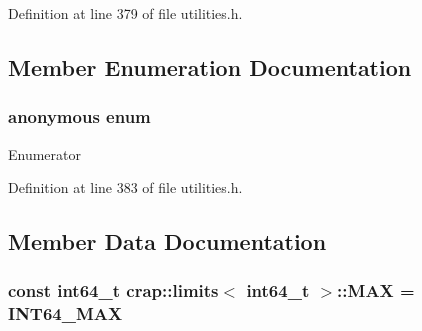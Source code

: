 Definition at line 379 of file utilities.\+h.



\subsection{Member Enumeration Documentation}
\hypertarget{structcrap_1_1limits_3_01int64__t_01_4_a6b01f82bacf55bcb136cebd46074b7d5}{\subsubsection[{anonymous enum}]{\setlength{\rightskip}{0pt plus 5cm}anonymous enum}}\label{structcrap_1_1limits_3_01int64__t_01_4_a6b01f82bacf55bcb136cebd46074b7d5}
\begin{Desc}
\item[Enumerator]\par
\begin{description}
\item[{\em 
\hypertarget{structcrap_1_1limits_3_01int64__t_01_4_a6b01f82bacf55bcb136cebd46074b7d5acf53b7e1c565b02ca4fcc9ff703a4a97}{I\+S\+\_\+\+I\+N\+T}\label{structcrap_1_1limits_3_01int64__t_01_4_a6b01f82bacf55bcb136cebd46074b7d5acf53b7e1c565b02ca4fcc9ff703a4a97}
}]\item[{\em 
\hypertarget{structcrap_1_1limits_3_01int64__t_01_4_a6b01f82bacf55bcb136cebd46074b7d5a2db27bf399f2fcc1977572ab2bfb9d66}{I\+S\+\_\+\+S\+I\+G\+N\+E\+D}\label{structcrap_1_1limits_3_01int64__t_01_4_a6b01f82bacf55bcb136cebd46074b7d5a2db27bf399f2fcc1977572ab2bfb9d66}
}]\end{description}
\end{Desc}


Definition at line 383 of file utilities.\+h.



\subsection{Member Data Documentation}
\hypertarget{structcrap_1_1limits_3_01int64__t_01_4_a0465e299affe12a893a3d5faa6ecf0df}{
\subsubsection[{M\+A\+X}]{\setlength{\rightskip}{0pt plus 5cm}const int64\+\_\+t {\bf crap\+::limits}$<$ int64\+\_\+t $>$\+::M\+A\+X = {\bf I\+N\+T64\+\_\+\+M\+A\+X}\hspace{0.3cm}{\ttfamily [static]}}}\label{structcrap_1_1limits_3_01int64__t_01_4_a0465e299affe12a893a3d5faa6ecf0df}


